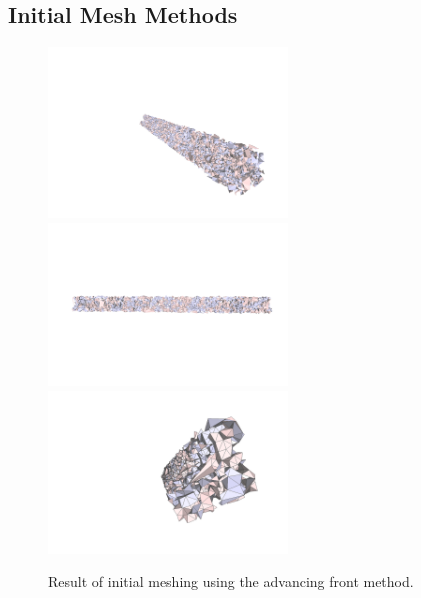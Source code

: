 \documentclass[12pt]{drexelthesis}
\let\Oldsubsection\subsection
\renewcommand{\subsection}{\FloatBarrier\Oldsubsection}
\begin{document}
\subsection{Initial Mesh Methods}

\begin{figure}[!ht]
	
	\centering
		\includegraphics[trim={4.5in 1in 1in 3in},clip,width=2.5in]{simulated-lab-scan/2cmnoise/2cmmesh/advancingfront00.png}
		\includegraphics[width=2.5in]{simulated-lab-scan/2cmnoise/2cmmesh/advancingfront01.png}
		\includegraphics[width=2.5in]{simulated-lab-scan/2cmnoise/2cmmesh/advancingfront02.png}
		\caption[Initial meshing using a raw advancing front approach]{\centering  Result of initial meshing using the advancing front method.}
		\label{2cmnoise:advancingfront}
\end{figure}
\end{document}
